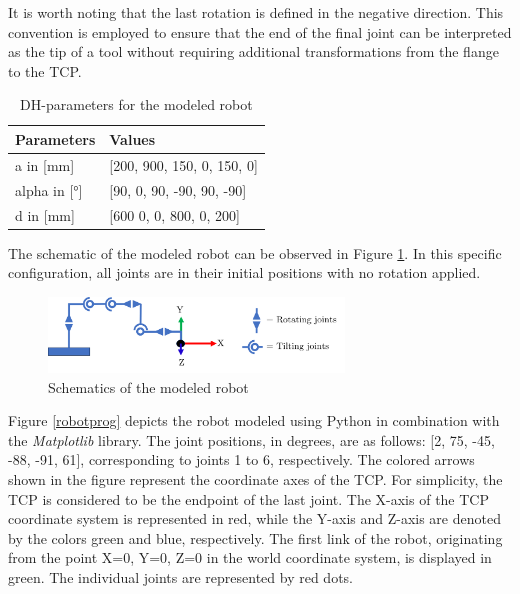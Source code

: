It is worth noting that the last rotation is defined in the negative direction. This convention is employed to ensure that the end of the final joint can be interpreted as the tip of a tool without requiring additional transformations from the flange to the \acrshort{TCP}.

\begin{table}[H]
	\centering
	\begin{tabular}{||l|l||}
		Parameters  & Values \\
		\hline
		\hline
		\hline
		a in [mm] 	&		[200, 900, 150, 0,   150, 0] \\
		alpha in [°]	&  	[90,  0,   90,  -90, 90,  -90] \\
		d in [mm]	& 		[600  0,   0,   800, 0,   200]\\
		
		\hline
		\hline
	\end{tabular}
	
	\caption{DH-parameters for the modeled robot}
	\label{DHp}
\end{table}

The schematic of the modeled robot can be observed in Figure \ref{schema}. In this specific configuration, all joints are in their initial positions with no rotation applied.\newline

\begin{figure}[H]
	\centerline{\includegraphics[width=0.7\textwidth]{figures/schema.png}}
	\caption{Schematics of the modeled robot}
	\label{schema}
\end{figure}

Figure \ref{robotprog} depicts the robot modeled using Python in combination with the \textit{Matplotlib} library. The joint positions, in degrees, are as follows: [2, 75, -45, -88, -91, 61], corresponding to joints 1 to 6, respectively. The colored arrows shown in the figure represent the coordinate axes of the \acrshort{TCP}. For simplicity, the \acrshort{TCP} is considered to be the endpoint of the last joint. The X-axis of the \acrshort{TCP} coordinate system is represented in red, while the Y-axis and Z-axis are denoted by the colors green and blue, respectively. The first link of the robot, originating from the point X=0, Y=0, Z=0 in the world coordinate system, is displayed in green. The individual joints are represented by red dots.

